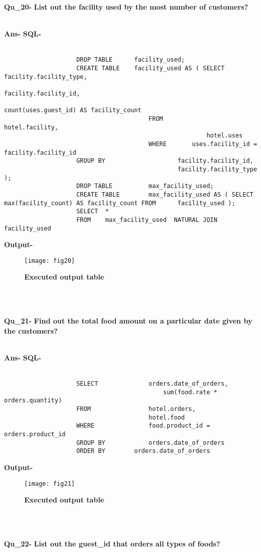 \documentclass[a4,12pt]{report}
\begin{document}
\textbf{Qu\_20-}  \textbf{List out the facility used by the most number of customers?} \\\

\textbf{Ans-}		\textbf{SQL-} \\\
\begin{lstlisting}
					DROP TABLE 		facility_used;
					CREATE TABLE 	facility_used AS ( SELECT facility.facility_type, 
																			facility.facility_id, 
																			count(uses.guest_id) AS facility_count
										FROM			hotel.facility, 
														hotel.uses
										WHERE 		uses.facility_id = facility.facility_id
					GROUP BY					facility.facility_id,
												facility.facility_type );
					DROP TABLE 			max_facility_used;
					CREATE TABLE 		max_facility_used AS ( SELECT	max(facility_count) AS facility_count FROM		facility_used );
					SELECT  *
					FROM	max_facility_used  NATURAL JOIN	facility_used
\end{lstlisting}					
\textbf{Output-} \\			   
\begin{figure}[hbtp]
\centering
\texttt{[image: fig20]}
\caption{\textbf{{\color{red}Executed output table}}}
\end{figure}
\\\



\newpage	
\textbf{Qu\_21-}  \textbf{Find out the total food amount on a particular date given by the customers?} \\\

\textbf{Ans-}		\textbf{SQL-} \\\
\begin{lstlisting}
					SELECT				orders.date_of_orders,
											sum(food.rate * orders.quantity) 
					FROM				hotel.orders,
										hotel.food
					WHERE				food.product_id = orders.product_id
					GROUP BY			orders.date_of_orders 
					ORDER BY   		orders.date_of_orders
\end{lstlisting}					
\textbf{Output-} \\			   
\begin{figure}[hbtp]
\centering
\texttt{[image: fig21]}
\caption{\textbf{{\color{red}Executed output table}}}
\end{figure}
\\\

\newpage				
\textbf{Qu\_22-}  \textbf{List out the guest\_id that orders all types of foods?} \\\
\end{document}
